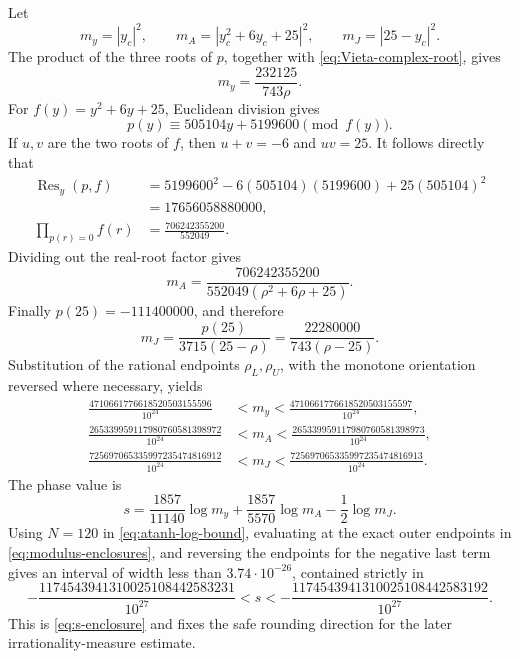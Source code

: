 \documentclass[11pt,reqno,letterpaper]{amsart}
\numberwithin{equation}{section}
\theoremstyle{definition}
\theoremstyle{remark}
\begin{document}
Let
\[
 m_y=|y_c|^2,\qquad
 m_A=|y_c^2+6y_c+25|^2,\qquad
 m_J=|25-y_c|^2.
\]
The product of the three roots of \(p\), together with
\eqref{eq:Vieta-complex-root}, gives
\begin{equation}\label{eq:my-resultant-value}
 m_y=\frac{232125}{743\rho}.
\end{equation}
For \(f(y)=y^2+6y+25\), Euclidean division gives
\[
 p(y)\equiv505104y+5199600\pmod{f(y)}.
\]
If \(u,v\) are the two roots of \(f\), then \(u+v=-6\) and \(uv=25\).
It follows directly that
\begin{align*}
 \operatorname{Res}_y(p,f)
 &=5199600^2-6(505104)(5199600)+25(505104)^2\\
 &=17656058880000,\\
 \prod_{p(r)=0}f(r)&=\frac{706242355200}{552049}.
\end{align*}
Dividing out the real-root factor gives
\begin{equation}\label{eq:mA-resultant-value}
 m_A=\frac{706242355200}
 {552049(\rho^2+6\rho+25)}.
\end{equation}
Finally \(p(25)=-111400000\), and therefore
\begin{equation}\label{eq:mJ-resultant-value}
 m_J=\frac{p(25)}{3715(25-\rho)}
 =\frac{22280000}{743(\rho-25)}.
\end{equation}
Substitution of the rational endpoints \(\rho_L,\rho_U\), with the
monotone orientation reversed where necessary, yields
\begin{equation}\label{eq:modulus-enclosures}
 \begin{aligned}
 \frac{4710661776618520503155596}{10^{24}}
 &<m_y<
 \frac{4710661776618520503155597}{10^{24}},\\
 \frac{265339959117980760581398972}{10^{24}}
 &<m_A<
 \frac{265339959117980760581398973}{10^{24}},\\
 \frac{725697065335997235474816912}{10^{24}}
 &<m_J<
 \frac{725697065335997235474816913}{10^{24}}.
 \end{aligned}
\end{equation}
The phase value is
\begin{equation}\label{eq:s-from-moduli}
 s=\frac{1857}{11140}\log m_y
   +\frac{1857}{5570}\log m_A-\frac12\log m_J.
\end{equation}
Using \(N=120\) in \eqref{eq:atanh-log-bound}, evaluating at the exact
outer endpoints in \eqref{eq:modulus-enclosures}, and reversing the
endpoints for the negative last term gives an interval of width less
than \(3.74\cdot10^{-26}\), contained strictly in
\begin{equation}\label{eq:s-rational-enclosure}
 -\frac{1174543941310025108442583231}{10^{27}}
 <s<
 -\frac{1174543941310025108442583192}{10^{27}}.
\end{equation}
This is \eqref{eq:s-enclosure} and fixes the safe rounding direction for
the later irrationality-measure estimate.
\end{document}

